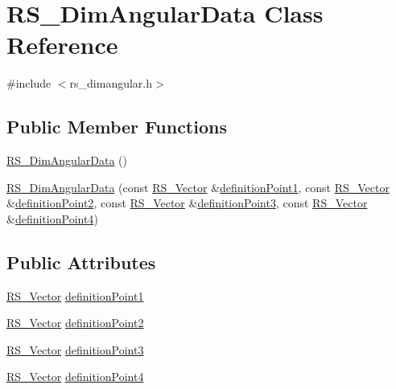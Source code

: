 \hypertarget{classRS__DimAngularData}{\section{R\-S\-\_\-\-Dim\-Angular\-Data Class Reference}
\label{classRS__DimAngularData}
}


{\ttfamily \#include $<$rs\-\_\-dimangular.\-h$>$}

\subsection*{Public Member Functions}
\begin{DoxyCompactItemize}
\item 
\hyperlink{classRS__DimAngularData_a5a1584ed8afc682757dab975981121e8}{R\-S\-\_\-\-Dim\-Angular\-Data} ()
\item 
\hyperlink{classRS__DimAngularData_ab85047f096b1678d3ca713cb630dcd16}{R\-S\-\_\-\-Dim\-Angular\-Data} (const \hyperlink{classRS__Vector}{R\-S\-\_\-\-Vector} \&\hyperlink{classRS__DimAngularData_afbf81b527fc17d9eced33a5dcbedd6b3}{definition\-Point1}, const \hyperlink{classRS__Vector}{R\-S\-\_\-\-Vector} \&\hyperlink{classRS__DimAngularData_a5479ca00f3595dd586e5d981e1c93759}{definition\-Point2}, const \hyperlink{classRS__Vector}{R\-S\-\_\-\-Vector} \&\hyperlink{classRS__DimAngularData_ab9bbe7a23004d2d9c2180f53335ed94f}{definition\-Point3}, const \hyperlink{classRS__Vector}{R\-S\-\_\-\-Vector} \&\hyperlink{classRS__DimAngularData_acad6d7ce39a18977e21e771033e6b780}{definition\-Point4})
\end{DoxyCompactItemize}
\subsection*{Public Attributes}
\begin{DoxyCompactItemize}
\item 
\hyperlink{classRS__Vector}{R\-S\-\_\-\-Vector} \hyperlink{classRS__DimAngularData_afbf81b527fc17d9eced33a5dcbedd6b3}{definition\-Point1}
\item 
\hyperlink{classRS__Vector}{R\-S\-\_\-\-Vector} \hyperlink{classRS__DimAngularData_a5479ca00f3595dd586e5d981e1c93759}{definition\-Point2}
\item 
\hyperlink{classRS__Vector}{R\-S\-\_\-\-Vector} \hyperlink{classRS__DimAngularData_ab9bbe7a23004d2d9c2180f53335ed94f}{definition\-Point3}
\item 
\hyperlink{classRS__Vector}{R\-S\-\_\-\-Vector} \hyperlink{classRS__DimAngularData_acad6d7ce39a18977e21e771033e6b780}{definition\-Point4}
\end{DoxyCompactItemize}
